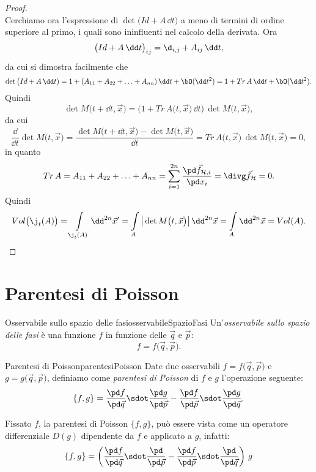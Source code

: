 \begin{proof}
\[	\]
	Cerchiamo ora l'espressione di \(\det\big(Id+A\,\dd t)\) a meno di termini di ordine superiore al primo, i quali sono ininfluenti nel calcolo della derivata. Ora 
	\[
		\big(Id + A\,\dd t\big)_{ij} = \d_{i,j} + A_{ij}\,\dd t,
	\]
	da cui si dimostra facilmente che
	\[
		\det\big(Id + A\,\dd t) = 1+(A_{11}+A_{22}+\ldots+A_{nn})\,\dd t + \bO(\dd t^2) = 1+Tr\,A\,\dd t+\bO(\dd t^2).
	\]
	Quindi
	\[
		\det M\big(t+\dd t,\vec{x}\big) = \Big(1+Tr\,A\big(t,\vec{x}\big)\,\dd t\Big)\,\det M\big(t,\vec{x}\big),
	\]
	da cui
	\[
		\frac{\dd}{\dd t}\det M\big(t,\vec{x}\big) = \frac{\det M\big(t+\dd t,\vec{x}\big)-\det M\big(t,\vec{x}\big)}{\dd t} = Tr\,A\big(t,\vec{x}\big)\,\det M\big(t,\vec{x}\big) = 0,
	\]
	in quanto
	\[
		Tr\,A = A_{11}+A_{22} + \ldots + A_{nn} = \sum_{i=1}^{2n} \frac{\pd\vec{f}_{\mathcal{H},i}}{\pd x_i} = \divg \vec{f}_{\mathcal{H}} = 0.
	\]
	Quindi
	\[
		Vol\big(\j_t(A)\big) = \int\limits_{\j_t(A)}\dd^{2n}\vec{x}' = \int\limits_A \big\lvert\det M\big(t,\vec{x}\big)\big\rvert\,\dd^{2n}\vec{x} = \int\limits_A \dd^{2n}\vec{x} = Vol(A).\qedhere
	\]
\end{proof}
%
%
\section{Parentesi di Poisson}

\begin{defn}{Osservabile sullo spazio delle fasi}{osservabileSpazioFasi}
	Un'\emph{osservabile sullo spazio delle fasi} è una funzione \(f\) in funzione delle \(\vec{q}\) e \(\vec{p}\):
	\[
		f = f\big(\vec{q},\vec{p}\big).
	\]
\end{defn}

\begin{defn}{Parentesi di Poisson}{parentesiPoisson}
	Date due osservabili \(f=f\big(\vec{q},\vec{p}\big)\) e \(g=g\big(\vec{q},\vec{p}\big)\), definiamo come \emph{parentesi di Poisson} di \(f\) e \(g\) l'operazione seguente:
	\[
		\{f,g\} = \frac{\pd f}{\pd\vec{q}}\sdot \frac{\pd g}{\pd\vec{p}} - \frac{\pd f}{\pd\vec{p}} \sdot \frac{\pd g}{\pd\vec{q}}.
	\]
\end{defn}

\begin{oss}
	Fissato \(f\), la parentesi di Poisson \(\{f,g\}\), può essere vista come un operatore differenziale \(D(g)\) dipendente da \(f\) e applicato a \(g\), infatti:
	\[
		\{f,g\} = \left(\frac{\pd f}{\pd\vec{q}}\sdot \frac{\pd}{\pd\vec{p}} - \frac{\pd f}{\pd\vec{p}} \sdot \frac{\pd}{\pd\vec{q}}\right)\,g
	\]
\end{oss}

